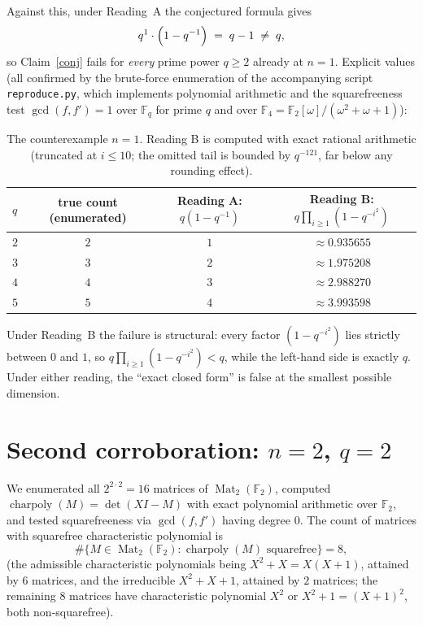 \documentclass[11pt]{article}
\newcommand{\Fq}{\mathbb{F}_q}
\newcommand{\Mat}{\operatorname{Mat}}
\begin{document}
Against this, under Reading~A the conjectured formula gives
\[
q^{1}\cdot\Bigl(1 - q^{-1}\Bigr) \;=\; q - 1 \;\neq\; q ,
\]
so Claim~\ref{conj} fails for \emph{every} prime power $q \ge 2$ already at
$n = 1$. Explicit values (all confirmed by the brute-force enumeration of the
accompanying script \texttt{reproduce.py}, which implements polynomial
arithmetic and the squarefreeness test $\gcd(f, f') = 1$ over $\Fq$ for prime
$q$ and over $\mathbb{F}_4 = \mathbb{F}_2[\omega]/(\omega^2 + \omega + 1)$):

\begin{table}[h]
\centering
\begin{tabular}{lccc}
\toprule
$q$ & true count (enumerated) & Reading A: $q(1 - q^{-1})$ & Reading B: $q\prod_{i\ge1}(1-q^{-i^2})$ \\
\midrule
$2$ & $2$ & $1$   & $\approx 0.935655$ \\
$3$ & $3$ & $2$   & $\approx 1.975208$ \\
$4$ & $4$ & $3$   & $\approx 2.988270$ \\
$5$ & $5$ & $4$   & $\approx 3.993598$ \\
\bottomrule
\end{tabular}
\caption{The counterexample $n = 1$. Reading B is computed with exact
rational arithmetic (truncated at $i \le 10$; the omitted tail is bounded by
$q^{-121}$, far below any rounding effect).}
\end{table}

Under Reading~B the failure is structural: every factor $(1 - q^{-i^2})$ lies
strictly between $0$ and $1$, so
$q\prod_{i\ge1}(1 - q^{-i^2}) < q$, while the left-hand side is exactly $q$.
Under either reading, the ``exact closed form'' is false at the smallest
possible dimension.

\section{Second corroboration: \texorpdfstring{$n = 2$, $q = 2$}{n = 2, q = 2}}

We enumerated all $2^{2 \cdot 2} = 16$ matrices of $\Mat_2(\mathbb{F}_2)$,
computed $\operatorname{charpoly}(M) = \det(XI - M)$ with exact polynomial
arithmetic over $\mathbb{F}_2$, and tested squarefreeness via
$\gcd(f, f')$ having degree $0$. The count of matrices with squarefree
characteristic polynomial is
\[
\#\{M \in \Mat_2(\mathbb{F}_2) : \operatorname{charpoly}(M) \text{ squarefree}\} = 8 ,
\]
(the admissible characteristic polynomials being $X^2 + X = X(X+1)$, attained
by $6$ matrices, and the irreducible $X^2 + X + 1$, attained by $2$ matrices;
the remaining $8$ matrices have characteristic polynomial $X^2$ or
$X^2 + 1 = (X+1)^2$, both non-squarefree).
\end{document}
